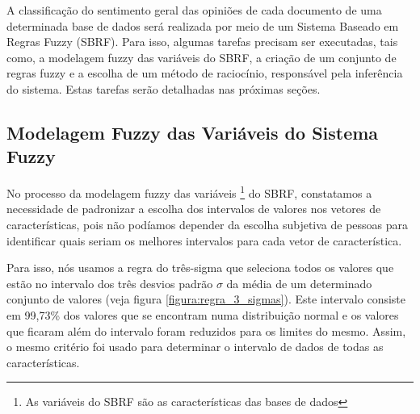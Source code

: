 \documentclass[template.tex]{subfiles}
\begin{document}
A classificação do sentimento geral das opiniões de cada documento de uma determinada base de dados será realizada por meio de um Sistema Baseado em Regras Fuzzy (SBRF). Para isso, algumas tarefas precisam ser executadas, tais como, a modelagem fuzzy das variáveis do SBRF, a criação de um conjunto de regras fuzzy e a escolha de um método de raciocínio, responsável pela inferência do sistema. Estas tarefas serão detalhadas nas próximas seções.

\subsection{Modelagem Fuzzy das Variáveis do Sistema Fuzzy}

No processo da modelagem fuzzy das variáveis \footnote{As variáveis do SBRF são as características das bases de dados} do SBRF, constatamos a necessidade de padronizar a escolha dos intervalos de valores nos vetores de características, pois não podíamos depender da escolha subjetiva de pessoas para identificar quais seriam os melhores intervalos para cada vetor de característica. 


Para isso, nós usamos a regra do três-sigma \cite{kazmier2004schaum} que seleciona todos os valores que estão no intervalo dos três desvios padrão $\sigma$ da média de um determinado conjunto de valores (veja figura \ref{figura:regra_3_sigmas}). Este intervalo consiste em 99,73\% dos valores que se encontram numa distribuição normal e os valores que ficaram além do intervalo foram reduzidos para os limites do mesmo. Assim, o mesmo critério foi usado para determinar o intervalo de dados de todas as características. 
\end{document}
